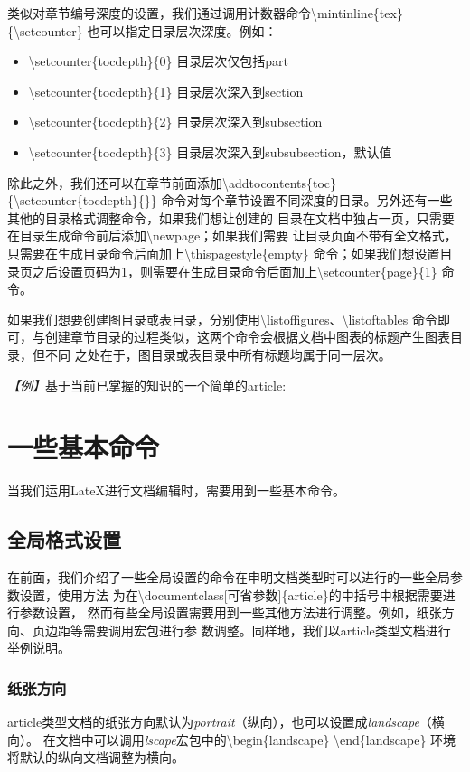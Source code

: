 类似对章节编号深度的设置，我们通过调用计数器命令\textbackslash mintinline\{tex\}\{\textbackslash setcounter\}
也可以指定目录层次深度。例如：
\begin{itemize}
    \item \textbackslash setcounter\{tocdepth\}\{0\} 目录层次仅包括part
    \item \textbackslash setcounter\{tocdepth\}\{1\} 目录层次深入到section
    \item \textbackslash setcounter\{tocdepth\}\{2\} 目录层次深入到subsection
    \item \textbackslash setcounter\{tocdepth\}\{3\} 目录层次深入到subsubsection，默认值
\end{itemize}

除此之外，我们还可以在章节前面添加\textbackslash addtocontents\{toc\}\{\textbackslash setcounter\{tocdepth\}\{\}\}
命令对每个章节设置不同深度的目录。另外还有一些其他的目录格式调整命令，如果我们想让创建的
目录在文档中独占一页，只需要在目录生成命令前后添加\textbackslash newpage；如果我们需要
让目录页面不带有全文格式，只需要在生成目录命令后面加上\textbackslash thispagestyle\{empty\}
命令；如果我们想设置目录页之后设置页码为1，则需要在生成目录命令后面加上\textbackslash setcounter\{page\}\{1\}
命令。

如果我们想要创建图目录或表目录，分别使用\textbackslash listoffigures、\textbackslash listoftables
命令即可，与创建章节目录的过程类似，这两个命令会根据文档中图表的标题产生图表目录，但不同
之处在于，图目录或表目录中所有标题均属于同一层次。

\emph{【例】}基于当前已掌握的知识的一个简单的article:


\section{一些基本命令}
当我们运用LateX进行文档编辑时，需要用到一些基本命令。

\subsection{全局格式设置}
在前面，我们介绍了一些全局设置的命令在申明文档类型时可以进行的一些全局参数设置，使用方法
为在\textbackslash documentclass[可省参数]\{article\}的中括号中根据需要进行参数设置，
然而有些全局设置需要用到一些其他方法进行调整。例如，纸张方向、页边距等需要调用宏包进行参
数调整。同样地，我们以article类型文档进行举例说明。

\subsubsection{纸张方向}
article类型文档的纸张方向默认为\emph{portrait}（纵向），也可以设置成\emph{landscape}（横向）。
在文档中可以调用\emph{lscape}宏包中的\textbackslash begin\{landscape\} \textbackslash end\{landscape\}
环境将默认的纵向文档调整为横向。

